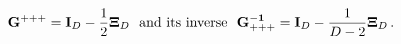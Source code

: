 \begin{equation} {\bf G^{+++}}={\bf I}_D -
\frac{1}{2}{\bf\Xi}_D~~{\rm and \ its\  inverse }~~ {\bf G^{-1}_{ +++}}={\bf I}_D -
\frac{1}{D-2}{\bf\Xi}_D\, .
\end{equation}


